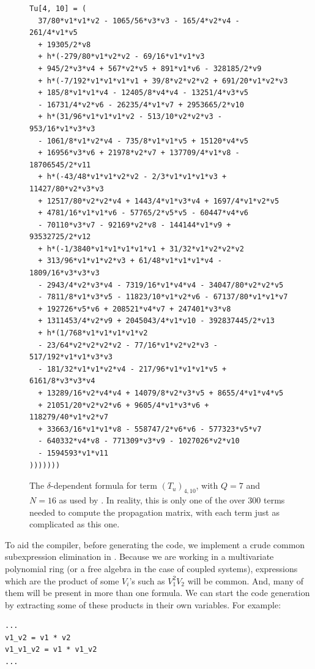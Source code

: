 \begin{figure}
\begin{verbatim}
Tu[4, 10] = (
  37/80*v1*v1*v2 - 1065/56*v3*v3 - 165/4*v2*v4 - 261/4*v1*v5
  + 19305/2*v8
  + h*(-279/80*v1*v2*v2 - 69/16*v1*v1*v3
  + 945/2*v3*v4 + 567*v2*v5 + 891*v1*v6 - 328185/2*v9
  + h*(-7/192*v1*v1*v1*v1 + 39/8*v2*v2*v2 + 691/20*v1*v2*v3
  + 185/8*v1*v1*v4 - 12405/8*v4*v4 - 13251/4*v3*v5
  - 16731/4*v2*v6 - 26235/4*v1*v7 + 2953665/2*v10
  + h*(31/96*v1*v1*v1*v2 - 513/10*v2*v2*v3 - 953/16*v1*v3*v3
  - 1061/8*v1*v2*v4 - 735/8*v1*v1*v5 + 15120*v4*v5
  + 16956*v3*v6 + 21978*v2*v7 + 137709/4*v1*v8 - 18706545/2*v11
  + h*(-43/48*v1*v1*v2*v2 - 2/3*v1*v1*v1*v3 + 11427/80*v2*v3*v3
  + 12517/80*v2*v2*v4 + 1443/4*v1*v3*v4 + 1697/4*v1*v2*v5
  + 4781/16*v1*v1*v6 - 57765/2*v5*v5 - 60447*v4*v6
  - 70110*v3*v7 - 92169*v2*v8 - 144144*v1*v9 + 93532725/2*v12
  + h*(-1/3840*v1*v1*v1*v1*v1 + 31/32*v1*v2*v2*v2
  + 313/96*v1*v1*v2*v3 + 61/48*v1*v1*v1*v4 - 1809/16*v3*v3*v3
  - 2943/4*v2*v3*v4 - 7319/16*v1*v4*v4 - 34047/80*v2*v2*v5
  - 7811/8*v1*v3*v5 - 11823/10*v1*v2*v6 - 67137/80*v1*v1*v7
  + 192726*v5*v6 + 208521*v4*v7 + 247401*v3*v8
  + 1311453/4*v2*v9 + 2045043/4*v1*v10 - 392837445/2*v13
  + h*(1/768*v1*v1*v1*v1*v2
  - 23/64*v2*v2*v2*v2 - 77/16*v1*v2*v2*v3 - 517/192*v1*v1*v3*v3
  - 181/32*v1*v1*v2*v4 - 217/96*v1*v1*v1*v5 + 6161/8*v3*v3*v4
  + 13289/16*v2*v4*v4 + 14079/8*v2*v3*v5 + 8655/4*v1*v4*v5
  + 21051/20*v2*v2*v6 + 9605/4*v1*v3*v6 + 118279/40*v1*v2*v7
  + 33663/16*v1*v1*v8 - 558747/2*v6*v6 - 577323*v5*v7
  - 640332*v4*v8 - 771309*v3*v9 - 1027026*v2*v10
  - 1594593*v1*v11
)))))))
\end{verbatim}
    \caption{The $\delta$-dependent formula for term $(T_u)_{4, 10}$, with $Q = 7$ and $N = 16$ as used by . In reality, this is only one of the over $300$ terms needed to compute the propagation matrix, with each term just as complicated as this one.}\label{fig:c2_generated_code}
\end{figure}

To aid the compiler, before generating the code, we implement a crude common subexpression elimination in \sage{}. Because we are working in a multivariate polynomial ring (or a free algebra in the case of coupled systems), expressions which are the product of some $V_i$'s such as  $V_1^2 V_2$ will be common. And, many of them will be present in more than one formula. We can start the code generation by extracting some of these products in their own variables. For example:
\begin{verbatim}
...
v1_v2 = v1 * v2
v1_v1_v2 = v1 * v1_v2
...
\end{verbatim}

